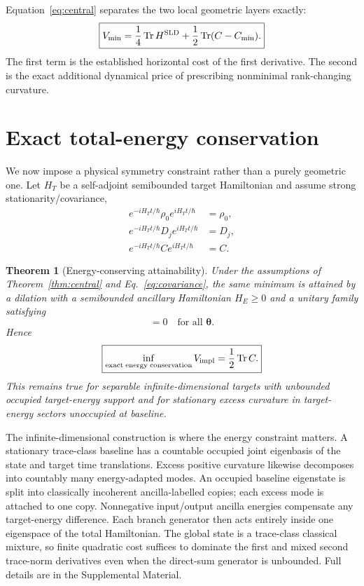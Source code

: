 \documentclass[aps,pra,preprint,nofootinbib]{revtex4-2}
\newtheorem{theorem}{Theorem}
\newcommand{\Tr}{\operatorname{Tr}}
\newcommand{\rhozero}{\rho_0}
\newcommand{\Vimpl}{V_{\rm impl}}
\newcommand{\Vmin}{V_{\min}}
\newcommand{\Cmin}{C_{\min}}
\newcommand{\Cker}{C}
\newcommand{\HT}{H_T}
\begin{document}
Equation~\eqref{eq:central} separates the two local geometric layers exactly:
\begin{equation}
 \boxed{
 \Vmin
 =\frac14\Tr H^{\rm SLD}
 +\frac12\Tr(\Cker-\Cmin).
 }
 \label{eq:decomposition}
\end{equation}
The first term is the established horizontal cost of the first derivative. The second is the exact additional dynamical price of prescribing nonminimal rank-changing curvature.

\section{Exact total-energy conservation}

We now impose a physical symmetry constraint rather than a purely geometric one. Let $\HT$ be a self-adjoint semibounded target Hamiltonian and assume strong stationarity/covariance,
\begin{align}
 e^{-i\HT t/\hbar}\rhozero e^{i\HT t/\hbar}&=\rhozero,\\
 e^{-i\HT t/\hbar}D_je^{i\HT t/\hbar}&=D_j,\\
 e^{-i\HT t/\hbar}\Cker e^{i\HT t/\hbar}&=\Cker.
 \label{eq:covariance}
\end{align}

\begin{theorem}[Energy-conserving attainability]
\label{thm:energy}
Under the assumptions of Theorem~\ref{thm:central} and Eq.~\eqref{eq:covariance}, the same minimum is attained by a dilation with a semibounded ancillary Hamiltonian $H_E\ge0$ and a unitary family satisfying
\begin{equation}
 [U(\bm\theta),\HT\otimes I+I\otimes H_E]=0
 \quad\text{for all }\bm\theta.
 \label{eq:energyconserve}
\end{equation}
Hence
\begin{equation}
 \boxed{
 \inf_{\rm exact\;energy\;conservation}\Vimpl
 =\frac12\Tr\Cker.
 }
 \label{eq:energyminimum}
\end{equation}
This remains true for separable infinite-dimensional targets with unbounded occupied target-energy support and for stationary excess curvature in target-energy sectors unoccupied at baseline.
\end{theorem}

The infinite-dimensional construction is where the energy constraint matters. A stationary trace-class baseline has a countable occupied joint eigenbasis of the state and target time translations. Excess positive curvature likewise decomposes into countably many energy-adapted modes. An occupied baseline eigenstate is split into classically incoherent ancilla-labelled copies; each excess mode is attached to one copy. Nonnegative input/output ancilla energies compensate any target-energy difference. Each branch generator then acts entirely inside one eigenspace of the total Hamiltonian. The global state is a trace-class classical mixture, so finite quadratic cost suffices to dominate the first and mixed second trace-norm derivatives even when the direct-sum generator is unbounded. Full details are in the Supplemental Material.
\end{document}
